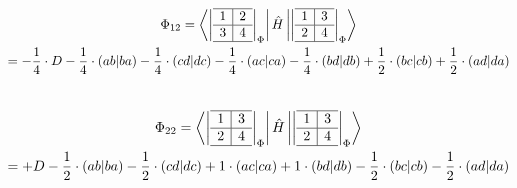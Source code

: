 \documentclass[12pt,a4paper]{article}
\begin{document}
\begin{gather}
\Phi_{12} = \bra{
\left|
  \begin{array}{c|c}
  \hline 
    1 & 2 \\ \hline 
    3 & 4 \\
    \hline 
  \end{array}
\right| _{\Phi}
} \hat{H} \ket{
\left|
  \begin{array}{c|c}
  \hline 
    1 & 3 \\ \hline 
    2 & 4 \\
    \hline 
  \end{array}
\right| _{\Phi}
} \\
 = - \frac{1}{4} \cdot D - \frac{1}{4} \cdot (ab|ba) - \frac{1}{4} \cdot (cd|dc) - \frac{1}{4} \cdot (ac|ca) -  \frac{1}{4} \cdot (bd|db) + \frac{1}{2} \cdot (bc|cb) + \frac{1}{2} \cdot (ad|da) 
 \end{gather} \\



\begin{gather}
\Phi_{22} = \bra{
\left|
  \begin{array}{c|c}
  \hline 
    1 & 3 \\ \hline 
    2 & 4 \\
    \hline 
  \end{array}
\right| _{\Phi}
} \hat{H} \ket{
\left|
  \begin{array}{c|c}
  \hline 
    1 & 3 \\ \hline 
    2 & 4 \\
    \hline 
  \end{array}
\right| _{\Phi}
} \\
= + D -  \frac{1}{2} \cdot (ab|ba) - \frac{1}{2} \cdot (cd|dc) + 1 \cdot (ac|ca) + 1 \cdot (bd|db) - \frac{1}{2} \cdot (bc|cb) - \frac{1}{2} \cdot (ad|da)
\end{gather} \\
\end{document}
